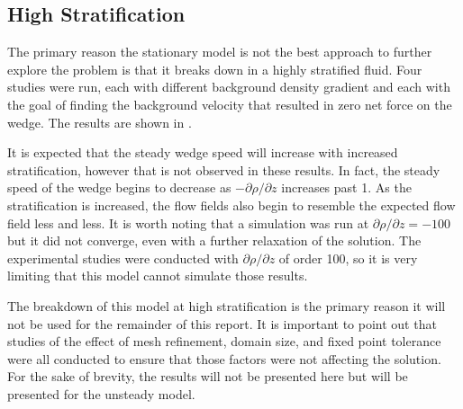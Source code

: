 \documentclass[12pt]{article}
\begin{document}

\subsection{High Stratification}

The primary reason the stationary model is not the best approach to further explore the problem is that it breaks down in a highly stratified fluid. Four studies were run, each with different background density gradient and each with the goal of finding the background velocity that resulted in zero net force on the wedge. The results are shown in .


It is expected that the steady wedge speed will increase with increased stratification, however that is not observed in these results. In fact, the steady speed of the wedge begins to decrease as $-\partial\rho/\partial z$ increases past 1. As the stratification is increased, the flow fields also begin to resemble the expected flow field less and less. It is worth noting that a simulation was run at $\partial\rho/\partial  z = -100$ but it did not converge, even with a further relaxation of the solution. The experimental studies were conducted with $\partial\rho/\partial  z $ of order 100, so it is very limiting that this model cannot simulate those results.

The breakdown of this model at high stratification is the primary reason it will not be used for the remainder of this report. It is important to point out that studies of the effect of mesh refinement, domain size, and fixed point tolerance were all conducted to ensure that those factors were not affecting the solution. For the sake of brevity, the results will not be presented here but will be presented for the unsteady model.
\end{document}
